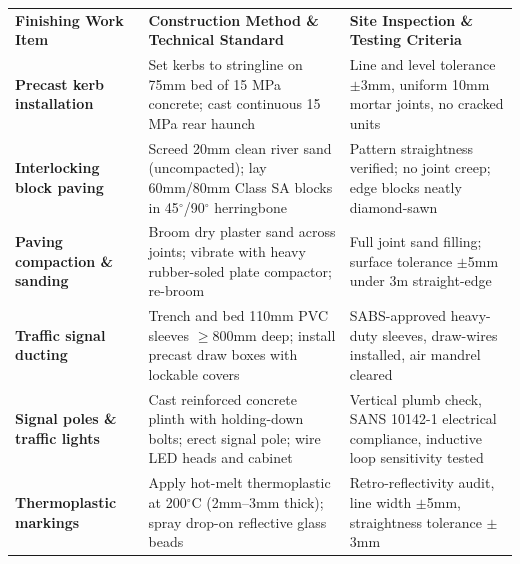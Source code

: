 \documentclass[a4paper,11pt]{article}
\begin{document}
{\fontsize{7.7pt}{9.8pt}\selectfont
\renewcommand{\arraystretch}{1.23}
\noindent
\begin{tabularx}{\textwidth}{@{}p{3.3cm} p{6.6cm} X@{}}
\rowcolor{mhnavy}
{\color{white}\bfseries Finishing Work Item} & {\color{white}\bfseries Construction Method \& Technical Standard} & {\color{white}\bfseries Site Inspection \& Testing Criteria} \\
\rowcolor{mhbluelight}
\bfseries Precast kerb installation & Set kerbs to stringline on 75mm bed of 15 MPa concrete; cast continuous 15 MPa rear haunch & Line and level tolerance $\pm$3mm, uniform 10mm mortar joints, no cracked units \\
\bfseries Interlocking block paving & Screed 20mm clean river sand (uncompacted); lay 60mm/80mm Class SA blocks in 45$^\circ$/90$^\circ$ herringbone & Pattern straightness verified; no joint creep; edge blocks neatly diamond-sawn \\
\rowcolor{mhbluelight}
\bfseries Paving compaction \& sanding & Broom dry plaster sand across joints; vibrate with heavy rubber-soled plate compactor; re-broom & Full joint sand filling; surface tolerance $\pm$5mm under 3m straight-edge \\
\bfseries Traffic signal ducting & Trench and bed 110mm PVC sleeves $\ge$800mm deep; install precast draw boxes with lockable covers & SABS-approved heavy-duty sleeves, draw-wires installed, air mandrel cleared \\
\rowcolor{mhbluelight}
\bfseries Signal poles \& traffic lights & Cast reinforced concrete plinth with holding-down bolts; erect signal pole; wire LED heads and cabinet & Vertical plumb check, SANS 10142-1 electrical compliance, inductive loop sensitivity tested \\
\bfseries Thermoplastic markings & Apply hot-melt thermoplastic at 200$^\circ$C (2mm--3mm thick); spray drop-on reflective glass beads & Retro-reflectivity audit, line width $\pm$5mm, straightness tolerance $\pm$3mm \\
\end{tabularx}
\renewcommand{\arraystretch}{1}
}

\vfill
\end{document}
